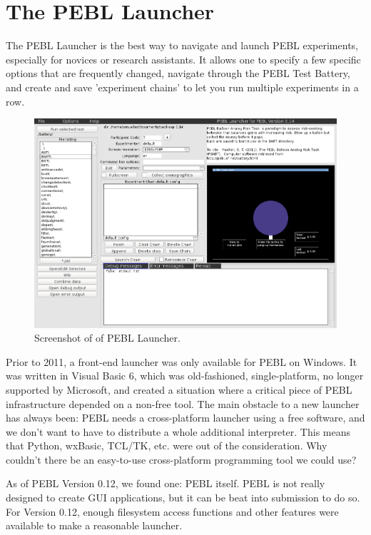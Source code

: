 
\chapter
{The PEBL Launcher}

The PEBL Launcher is the best way to navigate and launch PEBL
experiments, especially for novices or research assistants.  It allows
one to specify a few specific options that are frequently changed,
navigate through the PEBL Test Battery, and create and save
'experiment chains' to let you run multiple experiments in a row.

\begin{figure}[h]
\caption{Screenshot of of PEBL Launcher.}
\center
\includegraphics[scale=.35]{images/launcher.png} 
\end{figure}
\clearpage
{}
Prior to 2011, a front-end launcher was only available for PEBL on
Windows.  It was written in Visual Basic 6, which was old-fashioned,
single-platform, no longer supported by Microsoft, and created a
situation where a critical piece of PEBL infrastructure depended on a
non-free tool.  The main obstacle to a new launcher has always been:
PEBL needs a cross-platform launcher using a free software, and we
don't want to have to distribute a whole additional interpreter.  This
means that Python, wxBasic, TCL/TK, etc. were out of the
consideration.  Why couldn't there be an easy-to-use cross-platform
programming tool we could use?

As of PEBL Version 0.12, we found one: PEBL itself.  PEBL is not
really designed to create GUI applications, but it can be beat into
submission to do so.  For Version 0.12, enough filesystem access
functions and other features were available to make a reasonable
launcher.  

